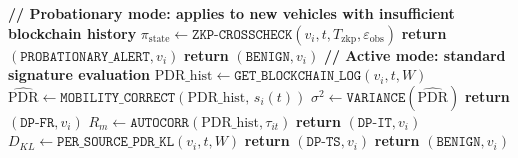 \documentclass[12pt, a4paper]{report}
\begin{document}
\begin{algorithm}[H]
\caption{Lightweight Rule-Based Grey Hole Detection --- Data Plane
(\texttt{LW-DP-Det})}
\begin{algorithmic}[1]
\small
{}
  \State \textbf{// Probationary mode: applies to new vehicles
    with insufficient blockchain history}
    \State $\pi_{\text{state}} \gets
      \texttt{ZKP-CROSSCHECK}(v_i, t, T_{\text{zkp}},
      \varepsilon_{\text{obs}})$
      \State \textbf{return}
        $(\texttt{PROBATIONARY\_ALERT}, v_i)$
    \Else
      \State \textbf{return} $(\texttt{BENIGN}, v_i)$
    \EndIf
  \EndIf
  \State \textbf{// Active mode: standard signature evaluation}
  \State $\text{PDR\_hist} \gets
    \texttt{GET\_BLOCKCHAIN\_LOG}(v_i, t, W)$
  \State $\widehat{\text{PDR}} \gets
    \texttt{MOBILITY\_CORRECT}
    (\text{PDR\_hist},\, s_i(t))$
  \State $\sigma^2 \gets
    \texttt{VARIANCE}(\widehat{\text{PDR}})$
    \State \textbf{return} $(\texttt{DP-FR}, v_i)$
  \EndIf
  \State $R_m \gets
    \texttt{AUTOCORR}(\text{PDR\_hist}, \tau_{it})$
    \State \textbf{return} $(\texttt{DP-IT}, v_i)$
  \EndIf
  \State $D_{KL} \gets
    \texttt{PER\_SOURCE\_PDR\_KL}(v_i, t, W)$
    \State \textbf{return} $(\texttt{DP-TS}, v_i)$
  \EndIf
  \State \textbf{return} $(\texttt{BENIGN}, v_i)$
\EndProcedure
\end{algorithmic}
\label{alg:lw_dp_det}
\end{algorithm}
\end{document}
